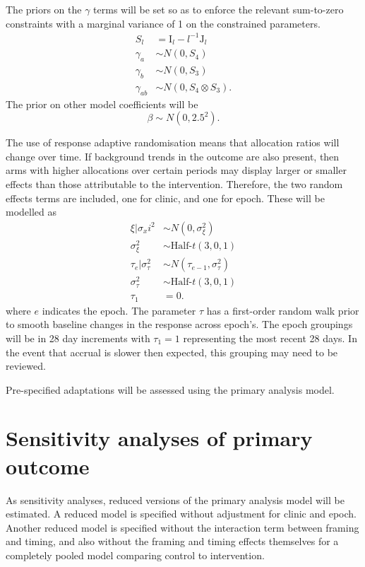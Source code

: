 \documentclass[
  bibliography=totoc]{scrreprt}
\begin{document}
The priors on the \(\gamma\) terms will be set so as to enforce the relevant sum-to-zero constraints with a marginal variance of 1 on the constrained parameters.
\[
\begin{aligned}
S_l &= \mathrm{I}_l - l^{-1}\mathrm{J}_l \\
\gamma_a &\sim N\left(0, S_4\right) \\
\gamma_b &\sim N\left(0, S_3\right) \\
\gamma_{ab} &\sim N\left(0, S_4\otimes S_3\right).
\end{aligned}
\]
The prior on other model coefficients will be
\[
\beta \sim N(0, 2.5^2).
\]

The use of response adaptive randomisation means that allocation ratios will change over time.
If background trends in the outcome are also present, then arms with higher allocations over certain periods may display larger or smaller effects than those attributable to the intervention.
Therefore, the two random effects terms are included, one for clinic, and one for epoch.
These will be modelled as
\[
\begin{aligned}
\xi|\sigma_xi^2 &\sim N(0, \sigma^2_\xi) \\
\sigma_\xi^2 &\sim \text{Half-}t(3, 0, 1) \\
\tau_e|\sigma_\tau^2 &\sim N(\tau_{e-1}, \sigma_\tau^2) \\
\sigma_\tau^2 &\sim \text{Half-}t(3, 0, 1) \\
\tau_1 &= 0.
\end{aligned}
\]
where \(e\) indicates the epoch.
The parameter \(\tau\) has a first-order random walk prior to smooth baseline changes in the response across epoch's.
The epoch groupings will be in 28 day increments with \(\tau_1=1\) representing the most recent 28 days.
In the event that accrual is slower then expected, this grouping may need to be reviewed.

Pre-specified adaptations will be assessed using the primary analysis model.

\hypertarget{sensitivity-analyses-of-primary-outcome}{%
\section{Sensitivity analyses of primary outcome}\label{sensitivity-analyses-of-primary-outcome}}

As sensitivity analyses, reduced versions of the primary analysis model will be estimated.
A reduced model is specified without adjustment for clinic and epoch.
Another reduced model is specified without the interaction term between framing and timing, and also without the framing and timing effects themselves for a completely pooled model comparing control to intervention.
\end{document}
